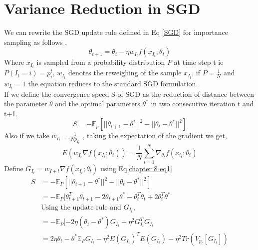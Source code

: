 \documentclass[a4paper,twoside]{iiththesis}
\theoremstyle{definition}
\theoremstyle{definition}
\theoremstyle{remark}
\begin{document}
\section{Variance Reduction in SGD}
We can rewrite the SGD update rule  defined in Eq \ref{SGD} for importance sampling as follows ,
\begin{equation}
\theta_{t+1} = \theta_{t} - \eta w_{I_t} f(x_{I_t}; \theta_t)
\end{equation}
Where $x_{I_t}$ is sampled from a probability distribution $P$ at time step t  ie $P(I_t = i) = p_i^t $, $w_{I_t}$ denotes the reweighing of the sample $x_{I_{t}}$, if $P = \frac{1}{N}$ and $w_{I_{t}} = 1$ the equation reduces to the standard SGD formulation.
\\
If we define the convergence speed S of SGD as the reduction of distance between the parameter $\theta$ and the optimal parameters $\theta^*$ in two consecutive iteration t and t+1.
\begin{equation}\label{chapter 8 eq1}
S = - \mathbb{E}_{p}[ || \theta_{t+1} - \theta^* || ^2 - || \theta_{t} - \theta^* || ^2 ]
\end{equation}
Also if we take $w_{I_t} = \frac{1}{N p_{I_t}}$ , taking the expectation of the gradient we get, 
\begin{equation}
E( w_{I_t} \nabla f(x_{I_t}; \theta_t)) = \frac{1}{N} \sum_{i=1}^N \nabla_{\theta_t}  f(x_{i_t}; \theta_t)
\end{equation}
Define $G_{I_t} = w_{I+t} \nabla f(x_{I_t}; \theta_t)$ using Eq\ref{chapter 8 eq1}
\begin{align}
S &= - \mathbb{E}_{P}[ || \theta_{t+1} - \theta^* || ^2 - || \theta_{t} - \theta^* || ^2 ] \\
&= - \mathbb{E}_{P} [\theta_{t+1}^T \theta_{t+1} - 2 \theta_{t+1} \theta^* - \theta_{t}^T\theta_{t} + 2 \theta_{t}^T \theta^* \\
& \text{Using the update rule and } G_{I_t}, \\
&= -\mathbb{E}_{P} [-2\eta(\theta_{t} - \theta^*) G_{I_t} + \eta^2 G_{I_t}^T G_{I_t} \\
&=2 \eta \theta_{t} - \theta^* \mathbb{E}_{P} G_{I_t} - \eta^2 E(G_{I_t})^T E(G_{I_t}) - \eta^2 Tr(V_{p_t}[G_{I_t}])
\end{align}
\end{document}
